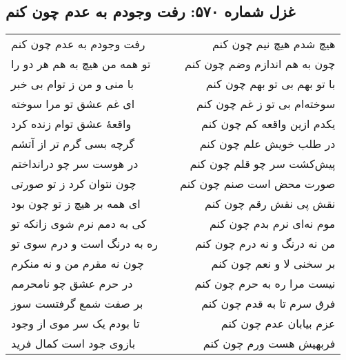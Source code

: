 \begin{center}
\section*{غزل شماره ۵۷۰: رفت وجودم به عدم چون کنم}
\label{sec:570}
\begin{longtable}{l p{0.5cm} r}
رفت وجودم به عدم چون کنم
&&
هیچ شدم هیچ نیم چون کنم
\\
تو همه من هیچ به هم هر دو را
&&
چون به هم اندازم وضم چون کنم
\\
با منی و من ز توام بی خبر
&&
با تو بهم بی تو بهم چون کنم
\\
ای غم عشق تو مرا سوخته
&&
سوخته‌ام بی تو ز غم چون کنم
\\
واقعهٔ عشق توام زنده کرد
&&
یکدم ازین واقعه کم چون کنم
\\
گرچه بسی گرم تر از آتشم
&&
در طلب خویش علم چون کنم
\\
در هوست سر چو درانداختم
&&
پیش‌کشت سر چو قلم چون کنم
\\
چون نتوان کرد ز تو صورتی
&&
صورت محض است صنم چون کنم
\\
ای همه بر هیچ ز تو چون بود
&&
نقش پی نقش رقم چون کنم
\\
کی به دمم نرم شوی زانکه تو
&&
موم نه‌ای نرم بدم چون کنم
\\
ره به درنگ است و درم سوی تو
&&
من نه درنگ و نه درم چون کنم
\\
چون نه مقرم من و نه منکرم
&&
بر سخنی لا و نعم چون کنم
\\
در حرم عشق چو نامحرمم
&&
نیست مرا ره به حرم چون کنم
\\
بر صفت شمع گرفتست سوز
&&
فرق سرم تا به قدم چون کنم
\\
تا بودم یک سر موی از وجود
&&
عزم بیابان عدم چون کنم
\\
بازوی جود است کمال فرید
&&
فربهیش هست ورم چون کنم
\\
\end{longtable}
\end{center}
